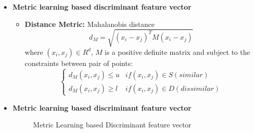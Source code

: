 \begin{frame}[t]{\subsecname}
	\topline
    \begin{itemize}
    	\item \textcolor{navy_theme}{\textbf{Metric learning based discriminant feature vector}}
    	\vspace{2em}
    	\begin{itemize}
    	    \item \textbf{Distance Metric:} Mahalanobis distance \cite{suarez2020tutorial}
    	    \begin{equation}
            	d_{M}=\sqrt{(x_{i}-x_{j})^{T}M(x_{i}-x_{j})}
            \end{equation}
            where $(x_{i},x_{j}) \in  R^{d}$, $M$ is a positive definite matrix and subject
            to the constraints between pair of points:
            \begin{equation}
            	\left\{\begin{matrix}
            		d_{M}(x_{i},x_{j}) \leq u & if(x_{i},x_{j}) \in S(similar)    \\
            		d_{M}(x_{i},x_{j}) \geq l & if(x_{i},x_{j}) \in D(dissimilar)
            	\end{matrix}\right.
            \end{equation}
    	\end{itemize}
    	
	\end{itemize}
\end{frame}

\begin{frame}[t]{\subsecname}
	\topline
    \begin{itemize}
    	\item \textcolor{navy_theme}{\textbf{Metric learning based discriminant feature vector}}
    	\vspace{2em}
    	\begin{figure}[!ht]
			\centering
			 \hspace{0.5em}
			 \hspace{0.5em}
			\caption{Metric Learning based Discriminant feature vector}
			\label{fig:da}
			\vspace{-4mm}
		\end{figure}
	\end{itemize}
\end{frame}

